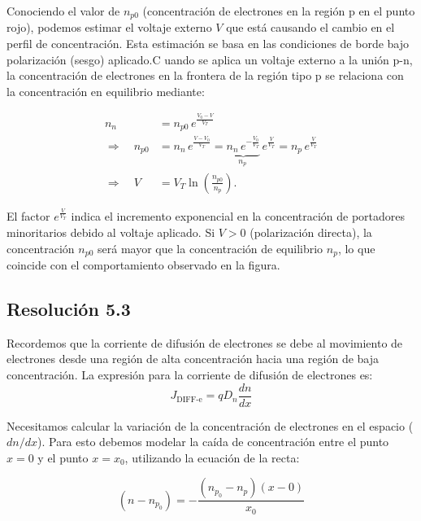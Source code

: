 \documentclass[
  11pt,
  letterpaper,
   addpoints,
   answers
  ]{exam}
\begin{document}
\begin{questions}
\begin{solution}
    Conociendo el valor de $n_{p0}$ (concentración de electrones en la región p en el punto rojo), podemos estimar el voltaje externo $V$ que está causando el cambio en el perfil de concentración. Esta estimación se basa en las condiciones de borde bajo polarización (sesgo) aplicado.C uando se aplica un voltaje externo a la unión p-n, la concentración de electrones en la frontera de la región tipo p se relaciona con la concentración en equilibrio mediante:

    \begin{align*}
    n_n &= n_{p0}\,e^{\frac{V_0 - V}{V_T}} \\[4pt]
    \Rightarrow\quad
    n_{p0} &= n_n\,e^{\frac{V - V_0}{V_T}}
           = \underbrace{n_n\,e^{-\frac{V_0}{V_T}}}_{\displaystyle n_p\ }\,
             e^{\frac{V}{V_T}}
           = n_p\,e^{\frac{V}{V_T}} \\[6pt]
    \Rightarrow\quad
    V &= V_T \ln\!\left(\frac{n_{p0}}{n_p}\right).
    \end{align*}

    El factor $e^{\frac{V}{V_T}}$ indica el incremento exponencial en la concentración de portadores minoritarios debido al voltaje aplicado. Si $V > 0$ (polarización directa), la concentración $n_{p0}$ será mayor que la concentración de equilibrio $n_p$, lo que coincide con el comportamiento observado en la figura.



    \subsection*{Resolución 5.3}
    Recordemos que la corriente de difusión de electrones se debe al movimiento de electrones desde una región de alta concentración hacia una región de baja concentración. La expresión para la corriente de difusión de electrones es:   
    \begin{equation}
        J_{\text{DIFF-e}} = qD_n\frac{dn}{dx} \tag{3}
    \end{equation}

    Necesitamos calcular la variación de la concentración de electrones en el espacio ($dn/dx$). Para esto debemos modelar la caída de concentración entre el punto $x=0$ y el punto $x=x_0$, utilizando la ecuación de la recta:

    \begin{equation}
        (n - n_{p_0}) = -\frac{(n_{p_0} - n_p)(x - 0)}{x_0}
    \end{equation}


\end{solution}
\end{questions}
\end{document}
